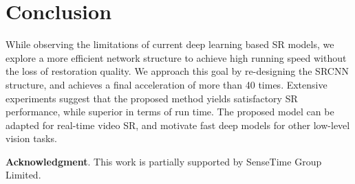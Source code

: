 \documentclass[runningheads]{llncs}
\begin{document}
\section{Conclusion}
While observing the limitations of current deep learning based SR models, we explore a more efficient network structure to achieve high running speed without the loss of restoration quality. We approach this goal by re-designing the SRCNN structure, and achieves a final acceleration of more than 40 times.
Extensive experiments suggest that the proposed method yields satisfactory SR performance, while superior in terms of run time. The proposed model can be adapted for real-time video SR, and motivate fast deep models for other low-level vision tasks.

\noindent
\textbf{Acknowledgment}. This work is partially supported by SenseTime Group Limited.
\end{document}
